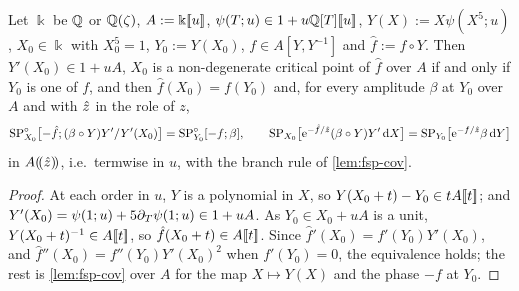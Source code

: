 \begin{lem}
\label{lem:fsp-cfu}
Let $\Bbbk$ be $\mathbb{Q}$ or $\mathbb{Q}(\zeta)$, $A:=\Bbbk[\![ u ]\!]$, $\psi(T;u)\in1+u\mathbb{Q}[T][\![ u ]\!]$, $Y(X):=X\psi(X^5;u)$, $X_0\in\Bbbk$ with $X_0^5=1$, $Y_0:=Y(X_0)$, $f\in A[Y,Y^{-1}]$ and $\hat f:=f\circ Y$. Then $Y'(X_0)\in1+uA$, $X_0$ is a non-degenerate critical point of $\hat f$ over $A$ if and only if $Y_0$ is one of $f$, and then $\hat f(X_0)=f(Y_0)$ and, for every amplitude $\beta$ at $Y_0$ over $A$ and with $\hat{z}$ in the role of $z$,
\[
\mathrm{SP}^{\circ}_{X_0}\bigl[-\hat f;(\beta\circ Y)Y'/Y'(X_0)\bigr]=\mathrm{SP}^{\circ}_{Y_0}[-f;\beta],\qquad\mathrm{SP}_{X_0}\bigl[\mathrm{e}^{-\hat f/\hat{z}}(\beta\circ Y)Y'\,\mathrm{d} X\bigr]=\mathrm{SP}_{Y_0}\bigl[\mathrm{e}^{-f/\hat{z}}\beta\,\mathrm{d} Y\bigr]
\]
in $A(\!(\hat{z})\!)$, i.e.\ termwise in $u$, with the branch rule of \cref{lem:fsp-cov}.
\end{lem}

\begin{proof}
At each order in $u$, $Y$ is a polynomial in $X$, so $Y(X_0+t)-Y_0\in tA[\![ t ]\!]$; and $Y'(X_0)=\psi(1;u)+5\partial_T\psi(1;u)\in1+uA$. As $Y_0\in X_0+uA$ is a unit, $Y(X_0+t)^{-1}\in A[\![ t ]\!]$, so $\hat f(X_0+t)\in A[\![ t ]\!]$. Since $\hat f'(X_0)=f'(Y_0)Y'(X_0)$, and $\hat f''(X_0)=f''(Y_0)Y'(X_0)^2$ when $f'(Y_0)=0$, the equivalence holds; the rest is \cref{lem:fsp-cov} over $A$ for the map $X\mapsto Y(X)$ and the phase $-f$ at $Y_0$.
\end{proof}

